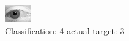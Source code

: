 \begin{figure}[h!]
\begin{center}
\includegraphics[width=0.60\columnwidth]{figures/ID2788_class_4_target_3.png}
\end{center}
\caption{ Classification: 4 actual target: 3}
\label{fig:ID2788_class_4_target_3}
\end{figure}
